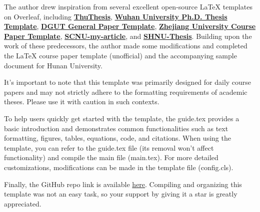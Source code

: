 \documentclass[
    report,     %
    oneside,    %
    UTF8,       %
    zihao=-4    %
]{config} %
\begin{document}
\begin{abstractEN}[0.6cm] %

The author drew inspiration from several excellent open-source \LaTeX{} templates on Overleaf, including 
\href{https://github.com/tuna/thuthesis}{\textbf{ThuThesis}}, \href{http://aff.whu.edu.cn/huangzh/}{\textbf{Wuhan University Ph.D. Thesis Template}}, 
\href{https://www.overleaf.com/latex/templates/dguttong-yong-lun-wen-slash-bao-gao-slash-zuo-ye-mo-ban-fei-guan-fang/gkymcyhwhjhj}{\textbf{DGUT General Paper Template}}, 
\href{https://www.overleaf.com/latex/templates/zhe-jiang-da-xue-ke-cheng-lun-wen-mo-ban/mjpzqvgsmdzn}{\textbf{Zhejiang University Course Paper Template}}, 
\href{https://www.overleaf.com/latex/templates/scnu-my-article/jkbbvhnddtsw}{\textbf{SCNU-my-article}}, and 
\href{https://www.overleaf.com/latex/templates/shnu-thesis/wsykzrksspgn}{\textbf{SHNU-Thesis}}. 
Building upon the work of these predecessors, the author made some modifications and completed the \LaTeX{} course paper template (unofficial) and the accompanying sample document for Hunan University.

It's important to note that this template was primarily designed for daily course papers and may not strictly adhere to the formatting requirements of academic theses. Please use it with caution in such contexts.

To help users quickly get started with the template, the guide.tex provides a basic introduction and demonstrates common functionalities such as text formatting, figures, tables, equations, code, and citations. When using the template, you can refer to the guide.tex file (its removal won't affect functionality) and compile the main file (main.tex). For more detailed customizations, modifications can be made in the template file (config.cls).

Finally, the GitHub repo link is available \href{https://github.com/zcyeee/HNU_LaTeX_Template}{here}. Compiling and organizing this template was not an easy task, so your support by giving it a star is greatly appreciated.




\def\keywordsEN{keyword 1; keyword 2; keyword 3; keyword 4; keyword 5}

\end{abstractEN}


\end{document}
